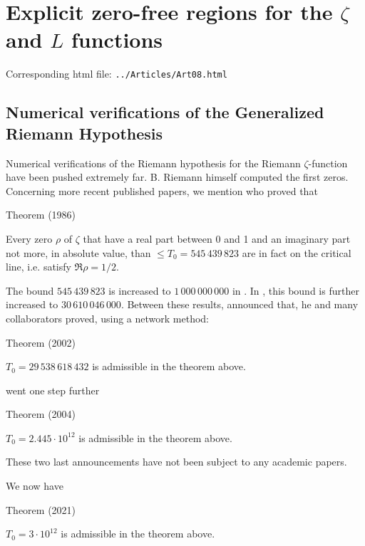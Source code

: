 \chapter{  Explicit zero-free regions for the $\zeta$ and $L$ functions}

Corresponding html file: \texttt{../Articles/Art08.html}









\section{Numerical verifications of the Generalized Riemann Hypothesis}


Numerical verifications of the Riemann hypothesis for the Riemann
$\zeta$-function have been pushed extremely far. B. Riemann himself computed the
first zeros. Concerning more recent published papers, we mention
\cite{Lune-Riele-Winter*86}
who proved that
\begin{thm}{Theorem (1986)}

  Every zero $\rho$ of $\zeta$ that have a real part between 0 and 1 and
  an imaginary part not more, in absolute value, than $\le T_0=545\,439\,823$
  are in fact on the critical line, i.e. satisfy $\Re \rho=1/2$.
\end{thm}

The bound $545\,439\,823$ is increased to $1\,000\,000\,000$ in
\cite{Platt*11}.
In
\cite{Platt*17},
this bound is further increased to
$30\,610\,046\,000$.
Between these results, 
\cite{Wedeniwski*02}
announced that, he and many collaborators proved, using a network method:
\begin{thm}{Theorem (2002)}

  $T_0=29\,538\,618\,432$ is admissible in the theorem above.
\end{thm}


\cite{Gourdon-Demichel*04}
went one step further
\par 
\begin{thm}{Theorem (2004)}

  $T_0=2.445\cdot 10^{12}$ is admissible in the theorem above.
\end{thm}

These two last announcements have not been subject to any academic papers.

We now have
\cite{Platt-Trudgian*21a}
\par 
\begin{thm}{Theorem (2021)}

  $T_0=3\cdot 10^{12}$ is admissible in the theorem above.
\end{thm}





